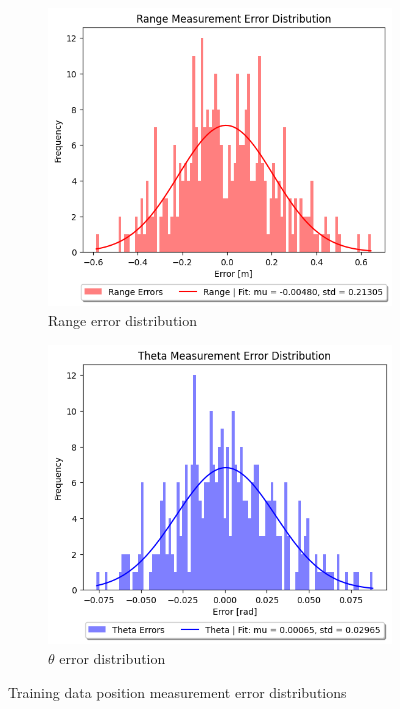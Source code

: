 \documentclass[12pt]{article}
\begin{document}
\begin{figure}[H]
    \centering
    \begin{subfigure}[b]{0.49\textwidth}
        \centering
        \includegraphics[width=\textwidth]{Problem 1/out/p1_r_pos_error_hist.png}
        \caption{Range error distribution}
        \label{fig:p1-r-pos-error}
    \end{subfigure}
    \begin{subfigure}[b]{0.49\textwidth}
        \centering
        \includegraphics[width=\textwidth]{Problem 1/out/p1_t_pos_error_hist.png}
        \caption{$\theta$ error distribution}
        \label{fig:p1-t-pos-error}
    \end{subfigure}
    \caption{Training data position measurement error distributions}
    \label{fig:p1-pos-error}
\end{figure}
\end{document}
